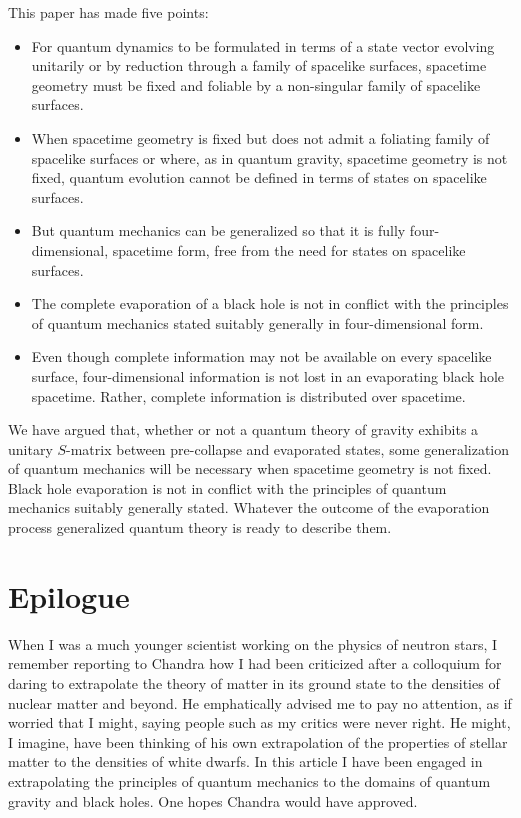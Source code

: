 This paper has made five points:

\begin{itemize}
\item For quantum dynamics to be formulated in terms of a state vector
evolving unitarily or by reduction through a family of spacelike
surfaces, spacetime geometry must be fixed and foliable by a
non-singular family of spacelike surfaces.

\item When spacetime geometry is fixed but does not admit a foliating family
of spacelike surfaces or where, as in quantum gravity, spacetime
geometry is not fixed, quantum evolution cannot be defined in terms of
states on spacelike surfaces.

\item But quantum mechanics can be generalized so that it is fully
four-dimensional, spacetime form, free from the need for states on
spacelike surfaces.

\item The complete evaporation of a black hole is not in conflict with
the principles of quantum mechanics stated suitably generally in
four-dimensional form.

\item 
Even though complete information may not be available on every spacelike
surface, four-dimensional information
is not lost in an evaporating black hole spacetime.  
Rather, complete information is distributed over spacetime.
\end{itemize}

We have argued that, whether  or not a quantum theory of gravity exhibits
a unitary $S$-matrix between pre-collapse and evaporated states, some
generalization of quantum mechanics will be necessary when spacetime
geometry is not fixed.  Black hole evaporation is not in conflict
with the principles of quantum mechanics suitably generally stated.
Whatever the outcome of the evaporation process generalized quantum
theory is ready to describe them.

\section{Epilogue}


When I was a much younger scientist working on the physics of neutron
stars, I remember reporting to Chandra how I had been criticized after a
colloquium for
daring to extrapolate the theory of matter in its ground state to the
densities of nuclear matter and beyond. He emphatically advised me to
pay no attention, as if worried that I might, saying people such as my critics
were never right.  He might, I imagine, have been thinking of his own
extrapolation of the properties of stellar matter to the densities of
white dwarfs.  In this article I have been engaged in extrapolating the
principles of quantum mechanics to the domains of quantum gravity and
black holes.  One hopes Chandra would have approved.


